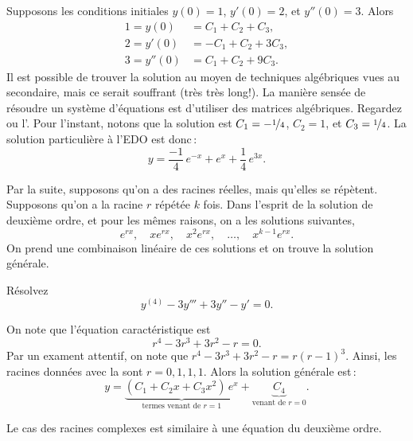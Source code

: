 \begin{example}
Supposons les conditions initiales $y(0) = 1$, $y'(0) = 2$,
et $y''(0) = 3$.  Alors
\begin{align*}
1 = y(0) & = C_1 + C_2 + C_3 , \\
2 = y'(0) & = -C_1 + C_2 + 3C_3 , \\
3 = y''(0) & = C_1 + C_2 + 9C_3 .
\end{align*}
Il est possible de trouver la solution au moyen de techniques algébriques vues au secondaire, mais ce serait souffrant (très très long!). La manière sensée de résoudre un système d'équations est d'utiliser des matrices algébriques. Regardez  ou l'.
Pour l'instant, notons que la solution est  $C_1 =
-\nicefrac{1}{4}$,
$C_2 = 1$, et $C_3 = \nicefrac{1}{4}$.  La solution particulière à l'EDO est donc\,:
\begin{equation*}
y = \frac{-1}{4}\, e^{-x} + e^x + \frac{1}{4}\, e^{3x} .
\end{equation*}
\end{example}

Par la suite, supposons qu'on a des racines réelles, mais qu'elles se répètent. Supposons qu'on a la racine $r$ répétée $k$ fois. Dans l'esprit de la solution de deuxième ordre, et pour les mêmes raisons, on a les solutions  suivantes,\: 
\begin{equation*}
e^{rx}, \quad xe^{rx}, \quad x^2 e^{rx}, \quad \ldots, \quad x^{k-1} e^{rx} .
\end{equation*}
On prend une combinaison linéaire de ces solutions et on trouve la solution générale. 
\begin{example}
Résolvez
\begin{equation*}
y^{(4)} - 3 y''' + 3 y'' - y' =  0 .
\end{equation*}

On note que l'équation caractéristique est 
\begin{equation*}
r^4 - 3r^3 + 3r^2 -r = 0 .
\end{equation*}
Par un exament attentif, on note que  $r^4 - 3r^3 + 3r^2 -r = r{(r-1)}^3$.  Ainsi, les racines données avec la 
 sont $r = 0, 1, 1, 1$.  Alors la solution générale est\,: 
\begin{equation*}
y = \underbrace{(C_1 + C_2 x + C_3 x^2)\, e^x}_{\text{termes venant de }
r=1} + \underbrace{C_4}_{\text{venant de } r=0} .
\end{equation*}
\end{example}

Le cas des racines complexes est similaire à une équation du deuxième ordre. 

